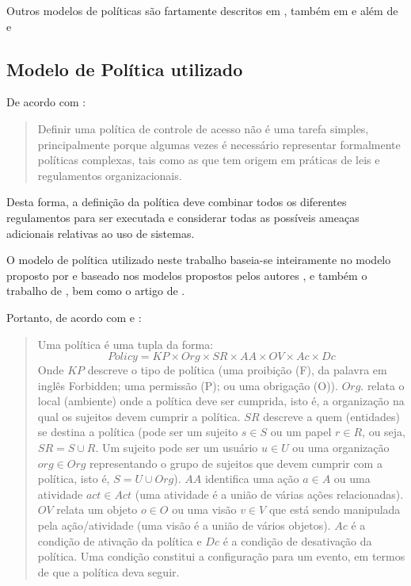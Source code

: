 Outros modelos de políticas são fartamente descritos em \cite{lupu_conflicts_1999}, também em \cite{sloman_security_2002} e \cite{koch_conflict_2002} além de \cite{bui_efficient_2019} e \cite{dunlop_dynamic_2002}

\subsection{Modelo de Política utilizado}\label{modelo_politica_utilizada}
De acordo com \cite{sarkis2017}:

\begin{quotation}
	Definir uma política de controle de acesso não é uma tarefa simples, principalmente porque algumas vezes é necessário representar formalmente políticas complexas, tais como as que tem origem em práticas de leis e regulamentos organizacionais.
\end{quotation} 
Desta forma, a definição da política deve combinar todos os diferentes regulamentos para ser executada e considerar todas as possíveis ameaças adicionais relativas ao uso de sistemas. \cite{di_vimercati_policies_2005}

O modelo de política utilizado neste trabalho baseia-se inteiramente no modelo proposto por \cite{sarkis2017} e \cite{sarkis:artigo:2016} baseado nos modelos propostos pelos autores \cite{cuppens_high_2007}, e também o trabalho de \cite{elrakaiby_formal_2012}, bem como o artigo de \cite{kalam_organization_2003}.

Portanto, de acordo com \cite[p.36]{sarkis2017} e \cite{sarkis:artigo:2016}:
\begin{quotation}
	Uma política é uma tupla da forma:
	\begin{equation}\label{politica}
	Policy = KP \times Org \times SR \times AA \times OV \times Ac \times Dc
	\end{equation}
	Onde $ KP $ descreve o tipo de política (uma proibição (F), da palavra em inglês Forbidden; uma permissão (P); ou uma obrigação (O)). $ Org $. relata o local (ambiente) onde a política deve ser cumprida, isto é, a organização na qual os sujeitos devem cumprir a política. $ SR $ descreve a quem (entidades) se destina a política (pode ser um sujeito $ s \in S $ ou um papel $ r \in R $, ou seja, $ SR = S \cup R $. Um sujeito pode ser um usuário $ u \in U $ ou uma organização $ org \in Org $ representando o grupo de sujeitos que devem cumprir com a política, isto é, $ S = U \cup Org $). $ AA $ identifica uma ação $ a \in A  $ ou uma atividade $ act \in Act  $ (uma atividade é a união de várias ações relacionadas). $ OV $ relata um objeto $ o \in O $ ou uma visão $ v \in V $ que está sendo manipulada pela ação/atividade (uma visão é a união de vários objetos). $ Ac $ é a condição de ativação da política e $ Dc $ é a condição de desativação da política. Uma condição constitui a configuração para um evento, em termos de que a política deva seguir. 
\end{quotation}


